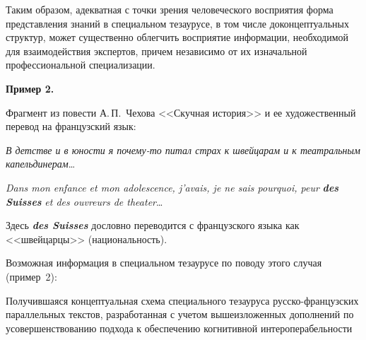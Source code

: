 \begin{multicols}{2}
     Таким образом, адекватная с точки зрения человеческого восприятия 
форма представления знаний в специальном тезаурусе, в том числе 
доконцептуальных структур, может существенно облегчить восприятие 
информации, необходимой для взаимодействия экспертов, причем 
независимо от их изначальной профессиональной специализации.

\medskip

\noindent
\textbf{Пример 2.}


{\small Фрагмент из повести А.\,П.~Чехова <<Скучная история>> и ее художественный 
перевод на французский язык:

\textit{В детстве и в юности я почему-то питал страх к швейцарам и к театральным 
капельдинерам}\ldots

\textit{Dans mon enfance et mon adolescence, j'avais, je ne sais pourquoi, peur}  
{\bfseries\textit{des Suisses}} \textit{et des ouvreurs de theater}\ldots

Здесь {\bfseries\textit{des Suisses}} дословно переводится с французского языка как 
<<швейцарцы>> (национальность).
}

\medskip
     
     Возможная информация в специальном тезаурусе по поводу этого 
случая (пример~2):

\medskip
     

\smallskip
     
     Получившаяся концептуальная схема специального тезауруса 
     рус\-ско-фран\-цуз\-ских параллельных текстов, разработанная с 
учетом вышеизложенных дополнений по усовершенствованию подхода к 
обеспечению когнитивной интероперабельности\linebreak\vspace*{-12pt}

\pagebreak

\end{multicols}

\begin{figure} %
\vspace*{1pt}
 \begin{center}
 \mbox{%
 \epsfxsize=114.703mm
 }
 \end{center}
 \vspace*{-6pt}
\vspace*{9pt}
\end{figure}

